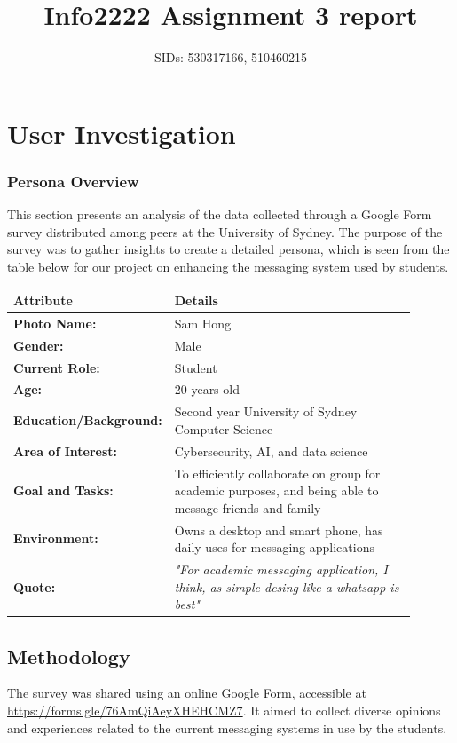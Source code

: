 \documentclass[12pt,a4paper]{article}
\title{Info2222 Assignment 3 report}
\author{SIDs: 530317166, 510460215}
\date{}
\begin{document}
\maketitle

\section{User Investigation}
\subsubsection*{Persona Overview}
This section presents an analysis of the data collected through a Google Form survey distributed among peers at the University of Sydney. The purpose of the survey was to gather insights to create a detailed persona, which is seen from the table below for our project on enhancing the messaging system used by students.

\noindent
\begin{tabular}{|p{0.3\linewidth}|p{0.6\linewidth}|}
\hline
\textbf{Attribute} & \textbf{Details} \\
\hline
\textbf{Photo Name:} & Sam Hong \\
\hline
\textbf{Gender:} & Male \\
\hline
\textbf{Current Role:} & Student \\
\hline
\textbf{Age:} & 20 years old \\
\hline
\textbf{Education/Background:} & Second year University of Sydney Computer Science \\
\hline
\textbf{Area of Interest:} & Cybersecurity, AI, and data science \\
\hline
\textbf{Goal and Tasks:} & To efficiently collaborate on group for academic purposes, and being able to message friends and family \\
\hline
\textbf{Environment:} & Owns a desktop and smart phone, has daily uses for messaging applications \\
\hline
\textbf{Quote:} & \textit{"For academic messaging application, I think, as simple desing like a whatsapp is best"} \\
\hline
\end{tabular}


\subsection*{Methodology}
The survey was shared using an online Google Form, accessible at \url{https://forms.gle/76AmQiAeyXHEHCMZ7}. It aimed to collect diverse opinions and experiences related to the current messaging systems in use by the students.
\end{document}
